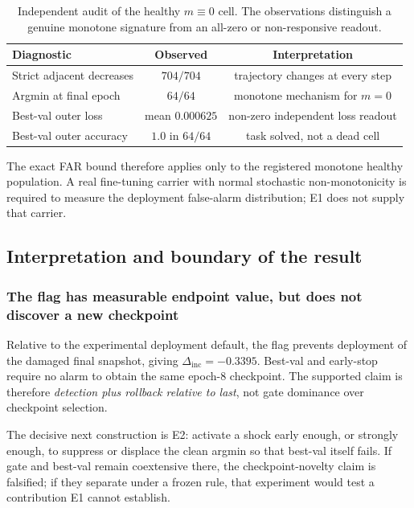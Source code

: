 \documentclass{article} %
\theoremstyle{remark}
\begin{document}
\begin{table}[t]
\centering
\caption{Independent audit of the healthy $m\equiv0$ cell. The observations distinguish a genuine
monotone signature from an all-zero or non-responsive readout.}
\label{tab:healthy-audit}
\small
\begin{tabular}{lcc}
\toprule
\textbf{Diagnostic} & \textbf{Observed} & \textbf{Interpretation} \\
\midrule
Strict adjacent decreases & $704/704$ & trajectory changes at every step \\
Argmin at final epoch & $64/64$ & monotone mechanism for $m=0$ \\
Best-val outer loss & mean $0.000625$ & non-zero independent loss readout \\
Best-val outer accuracy & $1.0$ in $64/64$ & task solved, not a dead cell \\
\bottomrule
\end{tabular}
\end{table}

The exact FAR bound therefore applies only to the registered monotone healthy population. A real
fine-tuning carrier with normal stochastic non-monotonicity is required to measure the deployment
false-alarm distribution; E1 does not supply that carrier.

\subsection{Interpretation and boundary of the result}
\label{sec:interpretation}

\subsubsection{The flag has measurable endpoint value, but does not discover a new checkpoint}
\label{sec:flag-value}

Relative to the experimental deployment default, the flag prevents deployment of the damaged final
snapshot, giving $\Delta_{\mathrm{inc}}=-0.3395$. Best-val and early-stop require no alarm to obtain
the same epoch-8 checkpoint. The supported claim is therefore \emph{detection plus rollback relative
to last}, not gate dominance over checkpoint selection.

The decisive next construction is E2: activate a shock early enough, or strongly enough, to
suppress or displace the clean argmin so that best-val itself fails. If gate and best-val remain
coextensive there, the checkpoint-novelty claim is falsified; if they separate under a frozen rule,
that experiment would test a contribution E1 cannot establish.
\end{document}
